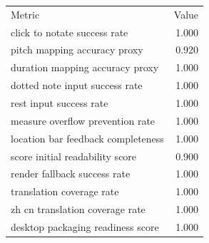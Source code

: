 \begin{tabular}{lr}
Metric & Value \\
click to notate success rate & 1.000 \\
pitch mapping accuracy proxy & 0.920 \\
duration mapping accuracy proxy & 1.000 \\
dotted note input success rate & 1.000 \\
rest input success rate & 1.000 \\
measure overflow prevention rate & 1.000 \\
location bar feedback completeness & 1.000 \\
score initial readability score & 0.900 \\
render fallback success rate & 1.000 \\
translation coverage rate & 1.000 \\
zh cn translation coverage rate & 1.000 \\
desktop packaging readiness score & 1.000 \\
\end{tabular}
